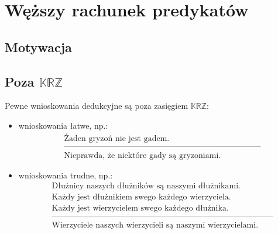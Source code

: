 \documentclass[12pt]{article}
\newcommand {\KRZ} {\ensuremath{\mathbb{KRZ}}}
\begin{document}
\section{Węższy rachunek predykatów}
\subsection{Motywacja}

\subsection{Poza \KRZ}
Pewne wnioskowania dedukcyjne są poza zasięgiem \KRZ:
%
\begin{itemize}
\item wnioskowania łatwe, np.:
%
\begin{eqnarray*}
& \textrm{Żaden gryzoń nie jest gadem.} \nonumber \\
& \textrm{------------------------------------------------------------------------}\nonumber \\
& \textrm{Nieprawda, że niektóre gady są gryzoniami.}
\end{eqnarray*}
%
\item wnioskowania trudne, np.:
%
\begin{eqnarray*}
& \textrm{Dłużnicy naszych dłużników są naszymi dłużnikami.}\nonumber \\
& \textrm{Każdy jest dłużnikiem swego każdego wierzyciela.}\nonumber \\
& \textrm{Każdy jest wierzycielem swego każdego dłużnika.}\nonumber \\
& \textrm{---------------------------------------------------------------------------------}\nonumber \\
& \textrm{Wierzyciele naszych wierzycieli są naszymi wierzycielami.}
\end{eqnarray*}
\end{itemize}
%
\end{document}
